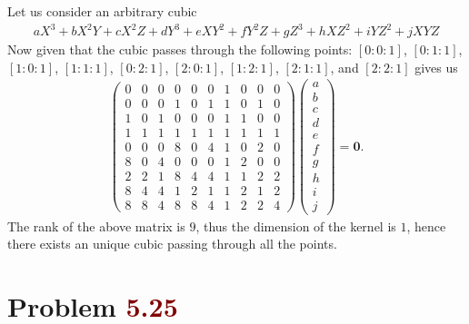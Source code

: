 \documentclass[12pt]{article}
\begin{document}
Let us consider an arbitrary cubic 
\begin{align*}
   aX^3 + bX^2Y + cX^2Z + d Y^3 + e XY^2 + f Y^2 Z + g Z^3 + h XZ^2 + i YZ^2 + j XYZ
\end{align*}
Now given that the cubic passes through the following points: $[0 : 0 : 1]$, $[0 : 1 : 1]$, $[1 : 0 : 1]$, $[1 : 1 : 1]$, $[0 : 2 : 1]$, $[2 : 0 : 1]$, $[1 : 2 : 1]$, $[2 : 1 : 1]$, and $[2 : 2 : 1]$ gives us
\begin{align*}
   \begin{pmatrix}
      0 & 0 & 0 & 0 & 0 & 0 & 1 & 0 & 0 & 0 \\
      0 & 0 & 0 & 1 & 0 & 1 & 1 & 0 & 1 & 0 \\ 
      1 & 0 & 1 & 0 & 0 & 0 & 1 & 1 & 0 & 0 \\ 
      1 & 1 & 1 & 1 & 1 & 1 & 1 & 1 & 1 & 1 \\ 
      0 & 0 & 0 & 8 & 0 & 4 & 1 & 0 & 2 & 0 \\ 
      8 & 0 & 4 & 0 & 0 & 0 & 1 & 2 & 0 & 0 \\ 
      2 & 2 & 1 & 8 & 4 & 4 & 1 & 1 & 2 & 2 \\ 
      8 & 4 & 4 & 1 & 2 & 1 & 1 & 2 & 1 & 2 \\ 
      8 & 8 & 4 & 8 & 8 & 4 & 1 & 2 & 2 & 4
   \end{pmatrix}\begin{pmatrix}
      a \\ b \\ c \\ d \\ e \\ f \\ g \\ h \\ i \\ j 
   \end{pmatrix} = \mathbf{0}.
\end{align*}
The rank of the above matrix is $9$, thus the dimension of the kernel is $1$, hence there exists an unique cubic passing through all the points.

\section*{Problem \textcolor{maroon}{5.25}}
\end{document}
